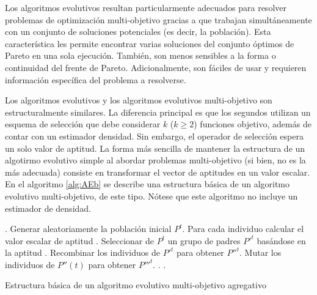   Los algoritmos evolutivos resultan particularmente adecuados para resolver problemas de optimizaci\'on multi-objetivo gracias a que
  trabajan simult\'aneamente con un conjunto de soluciones potenciales (es decir, la poblaci\'on). Esta caracter\'istica les permite 
  encontrar varias soluciones del conjunto \DIFdelbegin {}\DIFdelend \'optimos de Pareto en una sola ejecuci\'on. Tambi\'en, son menos sensibles a la forma o 
  continuidad del frente de Pareto. Adicionalmente, son f\'aciles de usar y \DIFdelbegin {}\DIFdelend requieren informaci\'on espec\'ifica del problema a resolverse.

  Los algoritmos evolutivos y los algoritmos evolutivos multi-objetivo son estructuralmente similares. La diferencia principal es que 
  los segundos utilizan un esquema de selecci\'on que debe considerar $k$ ($k \geq 2$) funciones objetivo, adem\'as de contar
  con un estimador densidad\DIFdelbegin {}\DIFdelend . Sin embargo, el operador de selecci\'on espera un solo valor de aptitud. La forma m\'as sencilla de mantener 
  la estructura de un algotirmo evolutivo simple al abordar problemas multi-objetivo (si bien, no es la m\'as adecuada) consiste en 
  transformar el vector de aptitudes en un valor escalar. En el algoritmo \ref{alg:AEb} se describe una estructura b\'asica de un 
  algoritmo evolutivo multi-objetivo, de este tipo. N\'otese que este algoritmo no incluye un estimador de densidad.

  \begin{algorithm}
      \begin{algorithmic}[1]			
	\STATE \DIFdelbegin {}\DIFdelend \DIFaddbegin {}\DIFaddend .
	\STATE Generar aleatoriamente la poblaci\'on inicial $P^t$.
	\DIFdelbegin %
\DIFdelend \DIFaddbegin {}
	\DIFaddend \STATE Para cada individuo \DIFdelbegin {}\DIFdelend \DIFaddbegin {}\DIFaddend calcular el valor escalar de aptitud \DIFdelbegin {}\DIFdelend \DIFaddbegin {}\DIFaddend .
	\STATE Seleccionar de $P^t$ un grupo de padres $P'^t$ bas\'andose en la aptitud \DIFaddbegin {}\DIFaddend .
	\STATE Recombinar los individuos de $P'^t$ para obtener $P''^t.$
	\STATE Mutar los individuos de $P''(t)$ para obtener $P'''^t$.
	\STATE \DIFdelbegin {}\DIFdelend \DIFaddbegin {}\DIFaddend .
	\STATE \DIFdelbegin {}\DIFdelend \DIFaddbegin {}\DIFaddend .
	\ENDWHILE 
  \end{algorithmic}
  \caption{Estructura b\'asica de un algoritmo evolutivo multi-objetivo agregativo}
  \label{alg:AEb}
  \end{algorithm}

